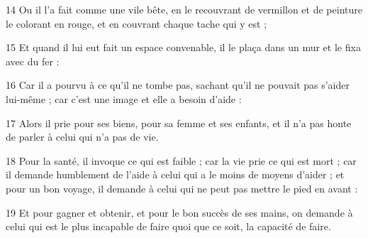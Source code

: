 \par 14 Ou il l'a fait comme une vile bête, en le recouvrant de vermillon et de peinture le colorant en rouge, et en couvrant chaque tache qui y est ;
\par 15 Et quand il lui eut fait un espace convenable, il le plaça dans un mur et le fixa avec du fer :
\par 16 Car il a pourvu à ce qu'il ne tombe pas, sachant qu'il ne pouvait pas s'aider lui-même ; car c'est une image et elle a besoin d'aide :
\par 17 Alors il prie pour ses biens, pour sa femme et ses enfants, et il n'a pas honte de parler à celui qui n'a pas de vie.
\par 18 Pour la santé, il invoque ce qui est faible ; car la vie prie ce qui est mort ; car il demande humblement de l'aide à celui qui a le moins de moyens d'aider ; et pour un bon voyage, il demande à celui qui ne peut pas mettre le pied en avant :
\par 19 Et pour gagner et obtenir, et pour le bon succès de ses mains, on demande à celui qui est le plus incapable de faire quoi que ce soit, la capacité de faire.


